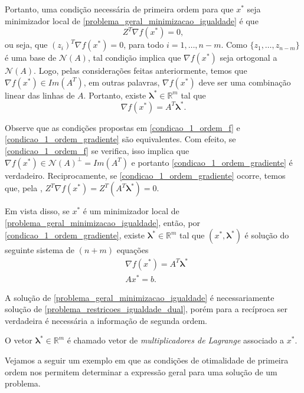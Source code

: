 \documentclass[12pt,a4paper]{scrartcl}
\def\RR{\mathds{R}}
\theoremstyle{definition}%
\begin{document}
Portanto, uma condição necessária de primeira ordem para que $x^{*}$ seja minimizador local de \eqref{problema_geral_minimizacao_igualdade} é que
\[ \label{condicao_1_ordem_f}
Z^{T} \nabla f(x^{*}) = 0,
\]
ou seja, que $(z_{i})^{T} \nabla f(x^{*}) =0$, para todo $i=1, \ldots , n-m$. Como $\{ z_{1}, \ldots , z_{n-m} \}$ é uma base de $\mathcal{N}(A)$, tal condição implica que $\nabla f(x^{*})$ seja ortogonal a $\mathcal{N}(A)$. Logo, pelas considerações feitas anteriormente, temos que $\nabla f(x^{*}) \in Im(A^{T})$, em outras palavras, $\nabla f(x^{*})$ deve ser uma combinação linear das linhas de $A$. Portanto, existe $\boldsymbol{\lambda}^{*} \in \RR^{m}$ tal que
\[ \label{condicao_1_ordem_gradiente}
\nabla f(x^{*}) = A^{T} \boldsymbol{\lambda}^{*} .
\] 

Observe que as condições propostas em \eqref{condicao_1_ordem_f} e \eqref{condicao_1_ordem_gradiente} são equivalentes. Com efeito, se \eqref{condicao_1_ordem_f} se verifica, isso implica que $\nabla f(x^{*}) \in \mathcal{N}(A)^{\bot} = Im(A^{T})$ e portanto \eqref{condicao_1_ordem_gradiente} é verdadeiro. Reciprocamente, se \eqref{condicao_1_ordem_gradiente} ocorre, temos que, pela , $Z^{T}\nabla f(x^{*}) = Z^{T}(A^{T} \boldsymbol{\lambda}^{*}) = 0$.

Em vista disso, se $x^{*}$ é um minimizador local de \eqref{problema_geral_minimizacao_igualdade}, então, por \eqref{condicao_1_ordem_gradiente}, existe $\boldsymbol{\lambda}^{*} \in \RR^{m}$ tal que $(x^{*}, \boldsymbol{\lambda}^{*})$ é solução do seguinte sistema de $(n+m)$ equações
\[ \label{problema_restricoes_igualdade_dual}
\begin{aligned}
& \nabla f(x^{*}) = A^{T} \boldsymbol{\lambda}^{*} \\
& Ax^{*} = b .
\end{aligned}
\]

A solução de \eqref{problema_geral_minimizacao_igualdade} é necessariamente solução de \eqref{problema_restricoes_igualdade_dual}, porém para a recíproca ser verdadeira é necessária a informação de segunda ordem.

O vetor $\boldsymbol{\lambda}^{*} \in \RR^{m}$ é chamado vetor de \emph{multiplicadores de Lagrange} associado a $x^{*}$.

Vejamos a seguir um exemplo em que as condições de otimalidade de primeira ordem nos permitem determinar a expressão geral para uma solução de um problema.
\end{document}
